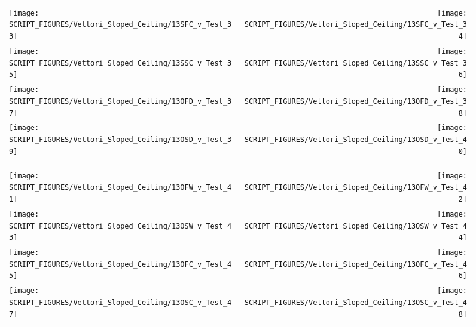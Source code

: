 \begin{figure}[p]
\begin{tabular*}{\textwidth}{l@{\extracolsep{\fill}}r}
\texttt{[image: SCRIPT\_FIGURES/Vettori\_Sloped\_Ceiling/13SFC\_v\_Test\_33]} &
\texttt{[image: SCRIPT\_FIGURES/Vettori\_Sloped\_Ceiling/13SFC\_v\_Test\_34]} \\
\texttt{[image: SCRIPT\_FIGURES/Vettori\_Sloped\_Ceiling/13SSC\_v\_Test\_35]} &
\texttt{[image: SCRIPT\_FIGURES/Vettori\_Sloped\_Ceiling/13SSC\_v\_Test\_36]} \\
\texttt{[image: SCRIPT\_FIGURES/Vettori\_Sloped\_Ceiling/13OFD\_v\_Test\_37]} &
\texttt{[image: SCRIPT\_FIGURES/Vettori\_Sloped\_Ceiling/13OFD\_v\_Test\_38]} \\
\texttt{[image: SCRIPT\_FIGURES/Vettori\_Sloped\_Ceiling/13OSD\_v\_Test\_39]} &
\texttt{[image: SCRIPT\_FIGURES/Vettori\_Sloped\_Ceiling/13OSD\_v\_Test\_40]} \\
\end{tabular*}
\label{Vettori_Sloped_5}
\end{figure}

\begin{figure}[p]
\begin{tabular*}{\textwidth}{l@{\extracolsep{\fill}}r}
\texttt{[image: SCRIPT\_FIGURES/Vettori\_Sloped\_Ceiling/13OFW\_v\_Test\_41]} &
\texttt{[image: SCRIPT\_FIGURES/Vettori\_Sloped\_Ceiling/13OFW\_v\_Test\_42]} \\
\texttt{[image: SCRIPT\_FIGURES/Vettori\_Sloped\_Ceiling/13OSW\_v\_Test\_43]} &
\texttt{[image: SCRIPT\_FIGURES/Vettori\_Sloped\_Ceiling/13OSW\_v\_Test\_44]} \\
\texttt{[image: SCRIPT\_FIGURES/Vettori\_Sloped\_Ceiling/13OFC\_v\_Test\_45]} &
\texttt{[image: SCRIPT\_FIGURES/Vettori\_Sloped\_Ceiling/13OFC\_v\_Test\_46]} \\
\texttt{[image: SCRIPT\_FIGURES/Vettori\_Sloped\_Ceiling/13OSC\_v\_Test\_47]} &
\texttt{[image: SCRIPT\_FIGURES/Vettori\_Sloped\_Ceiling/13OSC\_v\_Test\_48]} \\
\end{tabular*}
\label{Vettori_Sloped_6}
\end{figure}

